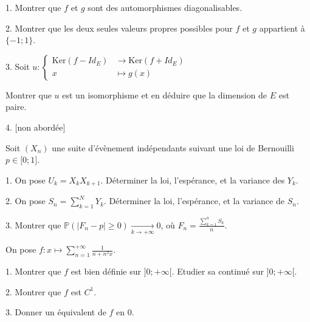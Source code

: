 \vspace{5pt}
1. Montrer que $f$ et $g$ sont des automorphismes diagonalisables.

\vspace{5pt}
2. Montrer que les deux seules valeurs propres possibles pour $f$ et $g$ appartient à $\{-1; 1\}$.

\vspace{5pt}
3. Soit $u :
\begin{cases}
  \mathrm{Ker}(f - Id_E) & \longrightarrow \mathrm{Ker}(f + Id_E) \\    
  x & \longmapsto \displaystyle g(x)
\end{cases}
$

Montrer que $u$ est un isomorphisme et en déduire que la dimension de $E$ est paire.

\vspace{5pt}
4. [non abordée]



\subetoiles


\noindent Soit $(X_n)$ une suite d'évènement indépendants suivant une loi de Bernouilli $p \in \lbrack 0;1 \rbrack$.

\vspace{5pt}
1. On pose $U_k = X_kX_{k+1}$. Déterminer la loi, l'espérance, et la variance des $Y_k$.

\vspace{5pt}
2. On pose $\displaystyle S_n = \sum_{k=1}^{N}Y_k$. Déterminer la loi, l'espérance, et la variance de $S_n$.

\vspace{5pt}
3. Montrer que $\mathbb{P}\left( |F_n - p| \geqslant 0 \right) \xrightarrow[k \rightarrow +\infty]{} 0$, où $\displaystyle F_n = \frac {\sum_{k=1}^{n}S_k} {n}$.



\subetoiles



\noindent On pose $\displaystyle f : x \mapsto \sum_{n=1}^{+\infty} \frac {1} {n + n^2x}$.

\vspace{5pt}
1. Montrer que $f$ est bien définie sur $\rbrack 0; +\infty \lbrack$. Etudier sa continué sur $\rbrack 0; +\infty \lbrack$.

\vspace{5pt}
2. Montrer que $f$ est $C^1$.

\vspace{5pt}
3. Donner un équivalent de $f$ en 0.



